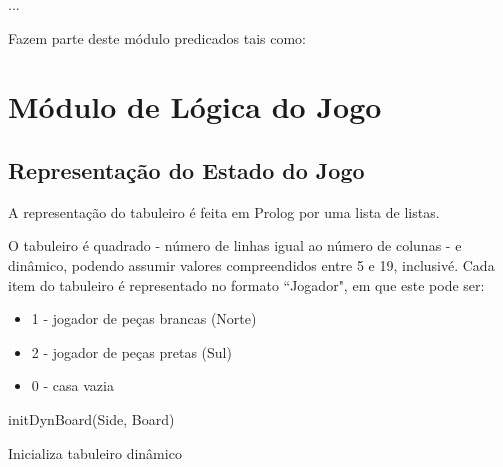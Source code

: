 \documentclass[15pt,a4paper]{article}
\begin{document}
\begin{code}[H]
	\begin{verbatimtab} %


...
\end{verbatimtab}
\caption{Fazem parte deste módulo predicados tais como:}
\end{code}


\newpage

\section{Módulo de Lógica do Jogo}




\subsection{Representação do Estado do Jogo}

A representação do tabuleiro é feita em Prolog por uma lista de listas.

O tabuleiro é quadrado - número de linhas igual ao número de colunas - e dinâmico, podendo assumir valores compreendidos entre 5 e 19, inclusivé.
Cada item do tabuleiro é representado no formato ``Jogador", em que este pode ser:
\begin{itemize}
\item 1 - jogador de peças brancas (Norte)
\item 2 - jogador de peças pretas (Sul)
\item 0 - casa vazia
\end{itemize}

\begin{code}[H]
	\begin{verbatimtab}
initDynBoard(Side, Board)
\end{verbatimtab}
\caption{Inicializa tabuleiro dinâmico}
\end{code}
\end{document}
